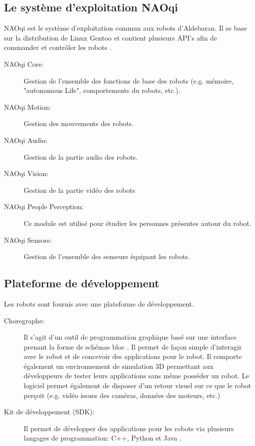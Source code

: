 \subsection{Le système d'exploitation NAOqi}
\label{Entreprise: Les produits: NAOqi}
NAOqi est le système d'exploitation commun aux robots d'Aldebaran. Il se base sur la distribution de Linux Gentoo et contient plusieurs API's afin de commander et contrôler les robots \cite{NAOqiTech}.
\begin{description}
	\item [NAOqi Core:] Gestion de l'ensemble des fonctions de base des robots (e.g. mémoire, "autonomous Life", comportements du robots, etc.).
	\item [NAOqi Motion:] Gestion des mouvements des robots.
	\item [NAOqi Audio:]  Gestion de la partie audio des robots.
	\item [NAOqi Vision:] Gestion de la partie vidéo des robots
	\item [NAOqi People Perception:] Ce module est utilisé pour étudier les personnes présentes autour du robot.
	\item [NAOqi Sensors:]  Gestion de l'ensemble des senseurs équipant les robots.
\end{description} 


\subsection{Plateforme de développement}
\label{Entreprise:Les produits: Nao: Plateforme de développement}
Les robots sont fournis avec une plateforme de développement.
\begin{description}
	\item[Choregraphe:] Il s'agit d'un outil de programmation graphique basé sur une interface prenant la forme de schémas bloc \cite{ChoregrapheTech}. Il permet de façon simple d'interagir avec le robot et de concevoir des applications pour le robot. Il comporte également un environnement de simulation 3D permettant aux développeurs de tester leurs applications sans même posséder un robot. Le logiciel permet également de disposer d'un retour visuel sur ce que le robot perçoit (e.g. vidéo issues des caméras, données des moteurs, etc.) 
	
	\item[Kit de développement (SDK):] Il permet de développer des applications pour les robots via plusieurs langages de programmation:  C++, Python et Java \cite{SDKTech}.
\end{description}

